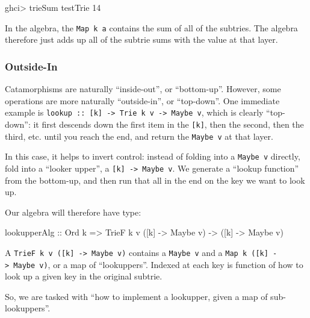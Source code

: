\documentclass[]{article}
\newenvironment{Shaded}{}{}
\newcommand{\DataTypeTok}[1]{\textcolor[rgb]{0.56,0.13,0.00}{#1}}
\newcommand{\DecValTok}[1]{\textcolor[rgb]{0.25,0.63,0.44}{#1}}
\newcommand{\FunctionTok}[1]{\textcolor[rgb]{0.02,0.16,0.49}{#1}}
\newcommand{\NormalTok}[1]{#1}
\newcommand{\OtherTok}[1]{\textcolor[rgb]{0.00,0.44,0.13}{#1}}
\begin{document}
\begin{Shaded}
\begin{Highlighting}[]
\NormalTok{ghci}\FunctionTok{>}\NormalTok{ trieSum testTrie}
\DecValTok{14}
\end{Highlighting}
\end{Shaded}

In the algebra, the \texttt{Map\ k\ a} contains the sum of all of the subtries.
The algebra therefore just adds up all of the subtrie sums with the value at
that layer.

\hypertarget{outside-in}{%
\subsubsection{Outside-In}\label{outside-in}}

Catamorphisms are naturally ``inside-out'', or ``bottom-up''. However, some
operations are more naturally ``outside-in'', or ``top-down''. One immediate
example is
\texttt{lookup\ ::\ {[}k{]}\ -\textgreater{}\ Trie\ k\ v\ -\textgreater{}\ Maybe\ v},
which is clearly ``top-down'': it first descends down the first item in the
\texttt{{[}k{]}}, then the second, then the third, etc. until you reach the end,
and return the \texttt{Maybe\ v} at that layer.

In this case, it helps to invert control: instead of folding into a
\texttt{Maybe\ v} directly, fold into a ``looker upper'', a
\texttt{{[}k{]}\ -\textgreater{}\ Maybe\ v}. We generate a ``lookup function''
from the bottom-up, and then run that all in the end on the key we want to look
up.

Our algebra will therefore have type:

\begin{Shaded}
\begin{Highlighting}[]
\NormalTok{lookupperAlg}
\OtherTok{    ::} \DataTypeTok{Ord}\NormalTok{ k}
    \OtherTok{=>} \DataTypeTok{TrieF}\NormalTok{ k v ([k] }\OtherTok{->} \DataTypeTok{Maybe}\NormalTok{ v)}
    \OtherTok{->}\NormalTok{ ([k] }\OtherTok{->} \DataTypeTok{Maybe}\NormalTok{ v)}
\end{Highlighting}
\end{Shaded}

A \texttt{TrieF\ k\ v\ ({[}k{]}\ -\textgreater{}\ Maybe\ v)} contains a
\texttt{Maybe\ v} and a \texttt{Map\ k\ ({[}k{]}\ -\textgreater{}\ Maybe\ v)},
or a map of ``lookuppers''. Indexed at each key is function of how to look up a
given key in the original subtrie.

So, we are tasked with ``how to implement a lookupper, given a map of
sub-lookuppers''.
\end{document}
